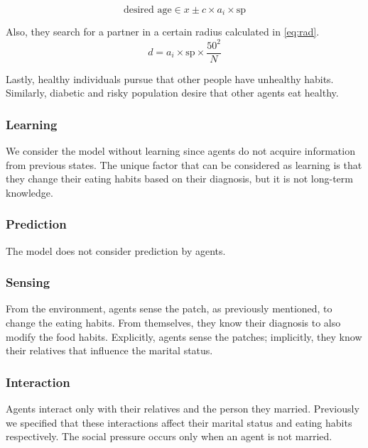 \begin{equation}\label{eq:age}
    \text{desired age} \in x \pm c \times a_i \times \mathrm{sp}
\end{equation}

Also, they search for a partner in a certain radius calculated in \cref{eq:rad}.
\begin{equation}\label{eq:rad}
    d=a_i\times\mathrm{sp}\times \dfrac{50^2}{N}
\end{equation}

Lastly, healthy individuals pursue that other people have unhealthy habits. Similarly, diabetic and risky population desire that other agents eat healthy.


\subsubsection{Learning}
 We consider the model without learning since agents do not acquire information from previous states. The unique factor that can be considered as learning is that they change their eating habits based on their diagnosis, but it is not long-term knowledge.
 
 \subsubsection{Prediction}
 The model does not consider prediction by agents.
 
 \subsubsection{Sensing}
 From the environment, agents sense the patch, as previously mentioned, to change the eating habits. From themselves, they know their diagnosis to also modify the food habits. Explicitly, agents sense the patches; implicitly, they know their relatives that influence the marital status.
 
 
 \subsubsection{Interaction}
 Agents interact only with their relatives and the person they married. Previously we specified that these interactions affect their marital status and eating habits respectively. The social pressure occurs only when an agent is not married.
